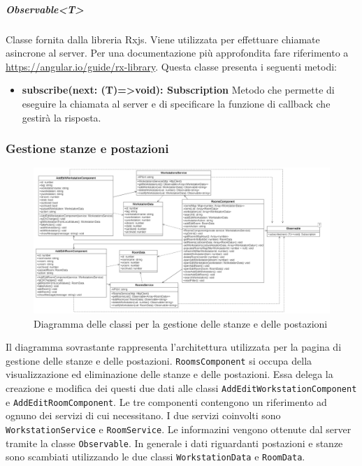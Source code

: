 \subparagraph{Observable<T>}
Classe fornita dalla libreria Rxjs. Viene utilizzata per effettuare chiamate asincrone al server. Per una documentazione più approfondita fare riferimento a \url{https://angular.io/guide/rx-library}. \newline
Questa classe presenta i seguenti metodi:
\begin{itemize}
	\item \textbf{subscribe(next: (T)=>void): Subscription} \newline
	Metodo che permette di eseguire la chiamata al server e di specificare la funzione di callback che gestirà la risposta.
\end{itemize}

\subsubsection{Gestione stanze e postazioni}
\begin{figure}[H]
	\centering
	\includegraphics[width=18cm]{res/images/webapp-visualAddEditStanzePostazioni-diagrammaClassi.png}
	\caption{Diagramma delle classi per la gestione delle stanze e delle postazioni}
	\label{fig:DiagrammaClassiStanzePostazioni}
\end{figure}
Il diagramma sovrastante rappresenta l'architettura utilizzata per la pagina di gestione delle stanze e delle postazioni. \newline
\texttt{RoomsComponent} si occupa della visualizzazione ed eliminazione delle stanze e delle postazioni. Essa delega la creazione e modifica dei questi due dati alle classi \texttt{AddEditWorkstationComponent} e \texttt{AddEditRoomComponent}. Le tre componenti contengono un riferimento ad ognuno dei servizi di cui necessitano. I due servizi coinvolti sono \texttt{WorkstationService} e \texttt{RoomService}. Le informazini vengono ottenute dal server tramite la classe \texttt{Observable}. In generale i dati riguardanti postazioni e stanze sono scambiati utilizzando le due classi \texttt{WorkstationData} e \texttt{RoomData}.


